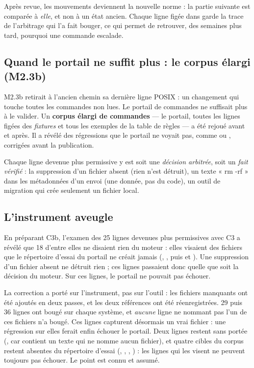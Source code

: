 \begin{pourquoi}
Après revue, les mouvements deviennent la nouvelle norme : la partie suivante est comparée à
\emph{elle}, et non à un état ancien. Chaque ligne figée dans  garde la
trace de l'arbitrage qui l'a fait bouger, ce qui permet de retrouver, des semaines plus tard,
pourquoi une commande escalade.
\end{pourquoi}

\subsection{Quand le portail ne suffit plus : le corpus élargi (M2.3b)}
M2.3b retirait à l'ancien chemin sa dernière ligne POSIX : un changement qui touche toutes les
commandes non lues. Le portail de \nbcorpus{} commandes ne suffisait plus à le valider. Un
\textbf{corpus élargi de \nbcorpuslarge{} commandes} --- le portail, toutes les lignes figées des
\textit{fixtures} et tous les exemples de la table de règles --- a été rejoué avant et après. Il a
révélé des régressions que le portail ne voyait pas, comme  ou
, corrigées avant la publication.

Chaque ligne devenue plus permissive y est soit une \emph{décision arbitrée}, soit un \emph{fait
vérifié} : la suppression d'un fichier absent (rien n'est détruit), un texte « rm -rf » dans les
métadonnées d'un envoi (une donnée, pas du code), un outil de migration qui crée seulement un
fichier local.

\subsection{L'instrument aveugle}
\label{sec:portail-aveugle}
En préparant C3b, l'examen des 25 lignes devenues plus permissives avec C3 a révélé que 18
d'entre elles ne disaient rien du moteur : elles visaient des fichiers que le répertoire d'essai
du portail ne créait jamais (, , puis 
et ). Une suppression d'un fichier absent ne détruit rien ; ces lignes passaient donc
quelle que soit la décision du moteur. Sur ces lignes, le portail ne pouvait pas échouer.

La correction a porté sur l'instrument, pas sur l'outil : les fichiers manquants ont été ajoutés
en deux passes, et les deux références ont été réenregistrées. 29 puis 36 lignes ont bougé sur
chaque système, et \emph{aucune} ligne ne nommant pas l'un de ces fichiers n'a bougé. Ces lignes
capturent désormais un vrai fichier : une régression sur elles ferait enfin échouer le portail.
Deux lignes restent sans portée (, car  contient un texte
qui ne nomme aucun fichier), et quatre cibles du corpus restent absentes du répertoire d'essai
(, , , ) : les lignes qui
les visent ne peuvent toujours pas échouer. Le point est connu et assumé.

